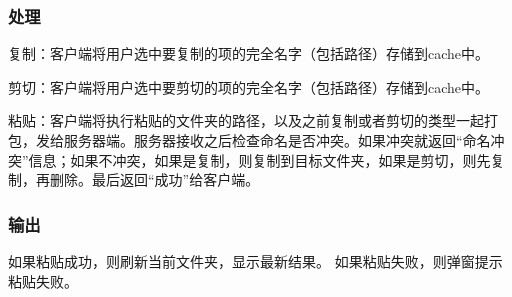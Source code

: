 \subsubsection{处理}
复制：客户端将用户选中要复制的项的完全名字（包括路径）存储到cache中。

剪切：客户端将用户选中要剪切的项的完全名字（包括路径）存储到cache中。

粘贴：客户端将执行粘贴的文件夹的路径，以及之前复制或者剪切的类型一起打包，发给服务器端。服务器接收之后检查命名是否冲突。如果冲突就返回“命名冲突”信息；如果不冲突，如果是复制，则复制到目标文件夹，如果是剪切，则先复制，再删除。最后返回“成功”给客户端。

\subsubsection{输出}
如果粘贴成功，则刷新当前文件夹，显示最新结果。
如果粘贴失败，则弹窗提示粘贴失败。

